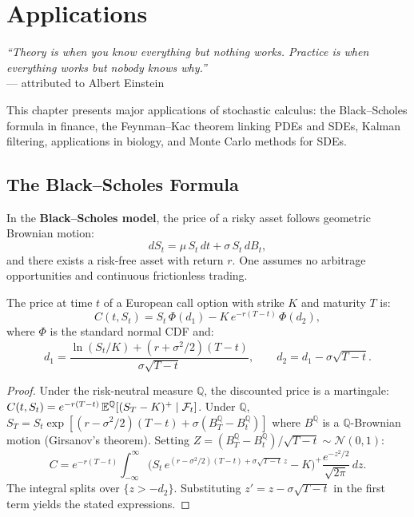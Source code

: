 \chapter{Applications}
\label{ch:applications}

\begin{center}
\textit{``Theory is when you know everything but nothing works.
Practice is when everything works but nobody knows why.''}\\[4pt]
--- attributed to Albert Einstein
\end{center}

\bigskip

This chapter presents major applications of stochastic calculus:
the Black--Scholes formula in finance, the Feynman--Kac theorem linking
PDEs and SDEs, Kalman filtering, applications in biology, and Monte
Carlo methods for SDEs.

\section{The Black--Scholes Formula}
\label{sec:black_scholes}

\begin{definition}
In the \textbf{Black--Scholes model}, the price of a risky asset follows
geometric Brownian motion:
\[
  dS_t = \mu\,S_t\,dt + \sigma\,S_t\,dB_t,
\]
and there exists a risk-free asset with return $r$. One assumes
no arbitrage opportunities and continuous frictionless trading.
\end{definition}

\begin{theorem}
\label{thm:bs}
The price at time $t$ of a European call option with strike $K$ and
maturity $T$ is:
\[
  C(t, S_t) = S_t\,\Phi(d_1) - K\,e^{-r(T-t)}\,\Phi(d_2),
\]
where $\Phi$ is the standard normal CDF and:
\[
  d_1 = \frac{\ln(S_t/K) + (r + \sigma^2/2)(T-t)}{\sigma\sqrt{T-t}},
  \qquad d_2 = d_1 - \sigma\sqrt{T-t}.
\]
\end{theorem}

\begin{proof}
Under the risk-neutral measure $\mathbb{Q}$, the discounted price is
a martingale: $C(t, S_t) = e^{-r(T-t)}\,\mathbb{E}^{\mathbb{Q}}[(S_T - K)^+
\mid \mathcal{F}_t]$. Under $\mathbb{Q}$,
$S_T = S_t\exp[(r - \sigma^2/2)(T-t) + \sigma(B_T^{\mathbb{Q}} -
B_t^{\mathbb{Q}})]$ where $B^{\mathbb{Q}}$ is a $\mathbb{Q}$-Brownian
motion (Girsanov's theorem). Setting
$Z = (B_T^{\mathbb{Q}} - B_t^{\mathbb{Q}})/\sqrt{T-t} \sim \mathcal{N}(0,1)$:
\[
  C = e^{-r(T-t)}\int_{-\infty}^{\infty}
    \bigl(S_t\,e^{(r-\sigma^2/2)(T-t)+\sigma\sqrt{T-t}\,z} - K\bigr)^+
    \frac{e^{-z^2/2}}{\sqrt{2\pi}}\,dz.
\]
The integral splits over $\{z > -d_2\}$. Substituting $z' = z -
\sigma\sqrt{T-t}$ in the first term yields the stated expressions.
\end{proof}

